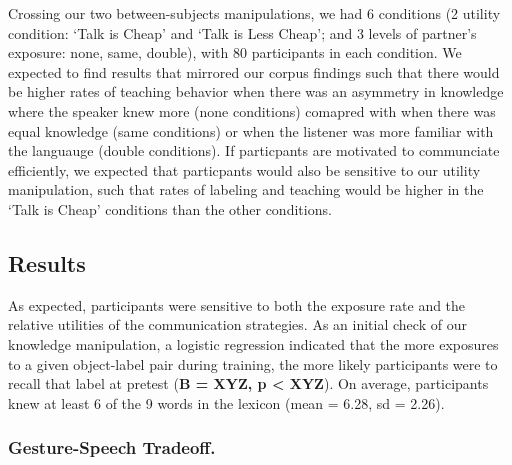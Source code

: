 \documentclass[10pt, letterpaper]{article}
\begin{document}
Crossing our two between-subjects manipulations, we had 6 conditions (2
utility condition: `Talk is Cheap' and `Talk is Less Cheap'; and 3
levels of partner's exposure: none, same, double), with 80 participants
in each condition. We expected to find results that mirrored our corpus
findings such that there would be higher rates of teaching behavior when
there was an asymmetry in knowledge where the speaker knew more (none
conditions) comapred with when there was equal knowledge (same
conditions) or when the listener was more familiar with the languauge
(double conditions). If particpants are motivated to communciate
efficiently, we expected that particpants would also be sensitive to our
utility manipulation, such that rates of labeling and teaching would be
higher in the `Talk is Cheap' conditions than the other conditions.

\subsection{Results}\label{results-1}

As expected, participants were sensitive to both the exposure rate and
the relative utilities of the communication strategies. As an initial
check of our knowledge manipulation, a logistic regression indicated
that the more exposures to a given object-label pair during training,
the more likely participants were to recall that label at pretest
(\textbf{B = XYZ, p \textless{} XYZ}). On average, participants knew at
least 6 of the 9 words in the lexicon (mean = 6.28, sd = 2.26).

\subsubsection{Gesture-Speech Tradeoff.}\label{gesture-speech-tradeoff.}
\end{document}

